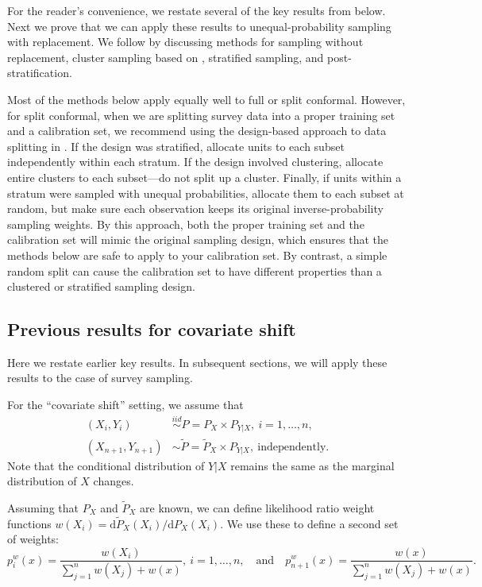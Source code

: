 \documentclass[10.5pt, letterpaper]{article}
\numberwithin{table}{section}
\numberwithin{figure}{section}
\numberwithin{equation}{section}
\begin{document}
For the reader's convenience, we restate several of the key results from \cite{tibshirani2019conformal} below. Next we prove that we can apply these results to unequal-probability sampling with replacement. We follow by discussing methods for sampling without replacement, cluster sampling based on \cite{dunn2022distribution}, stratified sampling, and post-stratification.

Most of the methods below apply equally well to full or split conformal. However, for split conformal, when we are splitting survey data into a proper training set and a calibration set, we recommend using the design-based approach to data splitting in \cite{wieczorek2022kfold}. If the design was stratified, allocate units to each subset independently within each stratum. If the design involved clustering, allocate entire clusters to each subset---do not split up a cluster. Finally, if units within a stratum were sampled with unequal probabilities, allocate them to each subset at random, but make sure each observation keeps its original inverse-probability sampling weights.
By this approach, both the proper training set and the calibration set will mimic the original sampling design, which ensures that the methods below are safe to apply to your calibration set. By contrast, a simple random split can cause the calibration set to have different properties than a clustered or stratified sampling design.


\subsection{Previous results for covariate shift  \citep{tibshirani2019conformal}}\label{sec:CovShift}

Here we restate earlier key results. In subsequent sections, we will apply these results to the case of survey sampling.

For the ``covariate shift'' setting, we assume that
\begin{align}\label{eqn:Tibs5}
(X_i, Y_i) &\stackrel{iid}{\sim} P = P_X \times P_{Y|X},\ i=1,\ldots,n, \nonumber \\
(X_{n+1}, Y_{n+1}) &\sim \tilde{P} = \tilde{P}_X \times P_{Y|X},\ \textrm{independently.}
\end{align}
Note that the conditional distribution of $Y|X$ remains the same as the marginal distribution of $X$ changes.

Assuming that $P_X$ and $\tilde{P}_X$ are known, we can define likelihood ratio weight functions $w(X_i) = \mathrm{d}\tilde{P}_X(X_i) / \mathrm{d}P_X(X_i)$.
We use these to define a second set of weights:
\begin{equation}\label{eqn:Tibs6}
p_i^w(x) = \frac{w(X_i)}{\sum_{j=1}^n w(X_j) + w(x)},\ i=1,\ldots,n,
\quad \mathrm{and} \quad
p_{n+1}^w(x) = \frac{w(x)}{\sum_{j=1}^n w(X_j) + w(x)}.
\end{equation}
\end{document}

